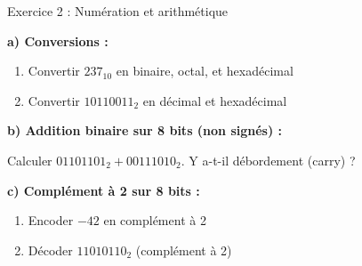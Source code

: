 \documentclass[aspectratio=1610]{beamer}
\begin{document}
\begin{frame}{Exercice 2 : Numération et arithmétique}

  \textbf{a) Conversions :}

  \begin{enumerate}
    \item Convertir $237_{10}$ en binaire, octal, et hexadécimal
    \item Convertir $10110011_2$ en décimal et hexadécimal
  \end{enumerate}

  \vspace{0.3cm}

  \textbf{b) Addition binaire sur 8 bits (non signés) :}

  Calculer $01101101_2 + 00111010_2$. Y a-t-il débordement (carry) ?

  \vspace{0.3cm}

  \textbf{c) Complément à 2 sur 8 bits :}

  \begin{enumerate}
    \item Encoder $-42$ en complément à 2
    \item Décoder $11010110_2$ (complément à 2)
  \end{enumerate}



\end{frame}
\end{document}
